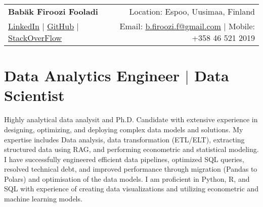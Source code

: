 \documentclass[a4paper,11pt]{article}
\begin{document}
	
	
	
	
	\begin{tabular*}{\textwidth}{l@{\extracolsep{\fill}}r}
		\textbf{\Huge Babäk Firoozi Fooladi \vspace{2pt}} & %
		Location: Espoo, Uusimaa, Finland \\ %
		\href{https://www.linkedin.com/in/babak-firoozi-fooladi/}{\uline{LinkedIn}} $|$ %
		\href{https://github.com/Babakfifoo}{\uline{GitHub}} $|$ %
		\href{https://stackoverflow.com/users/5116559/babak-fi-foo}{\uline{StackOverFlow}} & %
		Email: \href{mailto:b.firoozi.f@gmail.com}{\uline{b.firoozi.f@gmail.com}} $|$ %
		Mobile: +358 46 521 2019 \\ %
	\end{tabular*}
	
	
	
	\section{Data Analytics Engineer $|$ Data Scientist}
	\small{
		Highly analytical data analysit and Ph.D. Candidate with extensive experience in designing, optimizing, and deploying complex data models and solutions. My expertise includes Data analysis, data transformation (ETL/ELT), extracting structured data using RAG, and performing econometric and statistical modeling. I have successfully engineered efficient data pipelines, optimized SQL queries, resolved technical debt, and improved performance through migration (Pandas to Polars) and optimisation of the data models. I am proficient in Python, R, and SQL with experience of creating data visualizations and utilizing econometric and machine learning models.
	}
	
\end{document}
